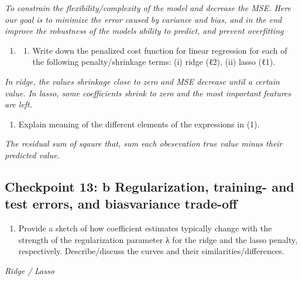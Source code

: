 \documentclass[
  letterpaper,
  DIV=11,
  numbers=noendperiod]{scrartcl}
\providecommand{\tightlist}{%
  \setlength{\itemsep}{0pt}\setlength{\parskip}{0pt}}\usepackage{longtable,booktabs,array}
\begin{document}
\emph{To constrain the flexibility/complexity of the model and decrease
the MSE. Here our goal is to minimize the error caused by variance and
bias, and in the end improve the robustness of the models ability to
predict, and prevent overfitting}

\begin{enumerate}
\def\labelenumi{(\alph{enumi})}
\setcounter{enumi}{1}
\item
  \begin{enumerate}
  \def\labelenumii{(\arabic{enumii})}
  \tightlist
  \item
    Write down the penalized cost function for linear regression for
    each of the following penalty/shrinkage terms: (i) ridge (ℓ2), (ii)
    lasso (ℓ1).
  \end{enumerate}
\end{enumerate}

\emph{In ridge, the values shrinkage close to zero and MSE decrease
until a certain value. In lasso, some coefficients shrink to zero and
the most important features are left.}

\begin{enumerate}
\def\labelenumi{(\arabic{enumi})}
\setcounter{enumi}{1}
\tightlist
\item
  Explain meaning of the different elements of the expressions in (1).
\end{enumerate}

\emph{The residual sum of sqaure that, sum each obesevation true value
minus their predicted value.}

\hypertarget{checkpoint-13-b-regularization-training--and-test-errors-and-biasvariance-trade-off}{%
\subsection{Checkpoint 13: b Regularization, training- and test errors,
and biasvariance
trade-off}\label{checkpoint-13-b-regularization-training--and-test-errors-and-biasvariance-trade-off}}

\begin{enumerate}
\def\labelenumi{(\alph{enumi})}
\tightlist
\item
  Provide a sketch of how coefficient estimates typically change with
  the strength of the regularization parameter λ for the ridge and the
  lasso penalty, respectively. Describe/discuss the curves and their
  similarities/differences.
\end{enumerate}

\emph{Ridge /} \emph{Lasso}
\end{document}
